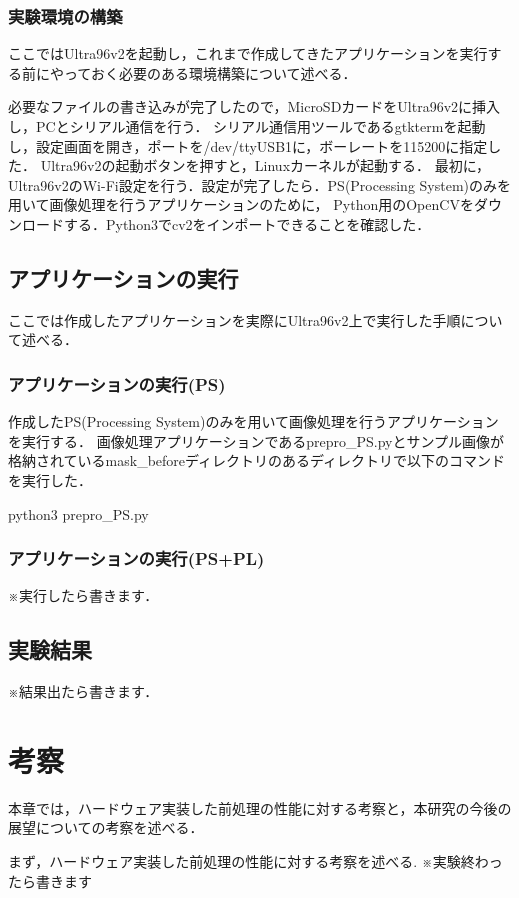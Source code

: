 \documentclass[11pt,a4j]{jreport}
\begin{document}
\subsection{実験環境の構築}
ここではUltra96v2を起動し，これまで作成してきたアプリケーションを実行する前にやっておく必要のある環境構築について述べる．

必要なファイルの書き込みが完了したので，MicroSDカードをUltra96v2に挿入し，PCとシリアル通信を行う．
シリアル通信用ツールであるgtktermを起動し，設定画面を開き，ポートを/dev/ttyUSB1に，ボーレートを115200に指定した．
Ultra96v2の起動ボタンを押すと，Linuxカーネルが起動する．
最初に，Ultra96v2のWi-Fi設定を行う．設定が完了したら．PS(Processing System)のみを用いて画像処理を行うアプリケーションのために，
Python用のOpenCVをダウンロードする．Python3でcv2をインポートできることを確認した．

\section{アプリケーションの実行}
ここでは作成したアプリケーションを実際にUltra96v2上で実行した手順について述べる．
\subsection{アプリケーションの実行(PS)}
作成したPS(Processing System)のみを用いて画像処理を行うアプリケーションを実行する．
画像処理アプリケーションであるprepro_PS.pyとサンプル画像が格納されているmask_beforeディレクトリのあるディレクトリで以下のコマンドを実行した．

python3 prepro_PS.py

\subsection{アプリケーションの実行(PS+PL)}
※実行したら書きます．

\section{実験結果}
※結果出たら書きます．
%
\chapter{考察}
本章では，ハードウェア実装した前処理の性能に対する考察と，本研究の今後の展望についての考察を述べる．

まず，ハードウェア実装した前処理の性能に対する考察を述べる.
※実験終わったら書きます
\end{document}
